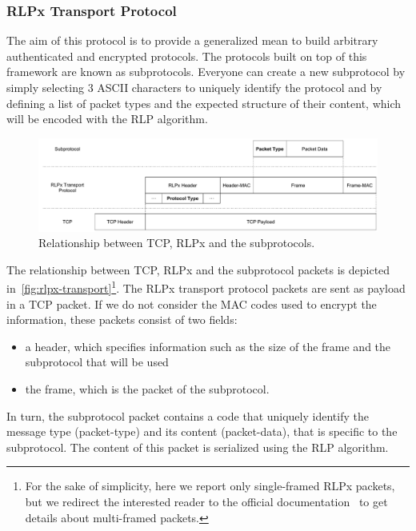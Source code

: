 \subsubsection{RLPx Transport Protocol}
\label{sec:rlpx-transport-protocol}

The aim of this protocol is to provide a generalized mean to build arbitrary
authenticated and encrypted protocols. The protocols built on top of this
framework are known as subprotocols. Everyone can create a new subprotocol by
simply selecting $3$ ASCII characters to uniquely identify the protocol and by
defining a list of packet types and the expected structure of their content,
which will be encoded with the RLP algorithm.

\begin{figure}
  \begin{center}
    \includegraphics[width=\textwidth]{./res/img/rlpx-transport}
    \caption{Relationship between TCP, RLPx and the subprotocols.}
    \label{fig:rlpx-transport}
  \end{center}
\end{figure}

The relationship between TCP, RLPx and the subprotocol packets is depicted
in~\autoref{fig:rlpx-transport}\footnote{For the sake of simplicity, here we
report only single-framed RLPx packets, but we redirect the interested reader to
the official documentation~\cite{rlpx} to get details about multi-framed
packets.}. The RLPx transport protocol packets are sent as payload in a TCP
packet. If we do not consider the MAC codes used to encrypt the information,
these packets consist of two fields:
\begin{itemize}
  \item a header, which specifies information such as the size of the frame and
  the subprotocol that will be used
  \item the frame, which is the packet of the subprotocol.
\end{itemize}

In turn, the subprotocol packet contains a code that uniquely identify the
message type (packet-type) and its content (packet-data), that is specific to
the subprotocol. The content of this packet is serialized using the RLP
algorithm.


